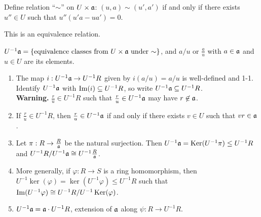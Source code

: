 \begin{definition}
    Define relation ``$\sim$'' on $U \times \mathfrak{a}$: $(u,a) \sim (u',a')$ if and only if there exists $u'' \in U$ such that $u''(u'a - ua') = 0$.
\end{definition}

\begin{fact}
    This is an equivalence relation.
\end{fact}

\begin{notation}
    $U^{-1}\mathfrak{a} = \{\text{equivalence classes from $U \times \mathfrak{a}$ under $\sim$}\}$, and $a/u$ or $\frac{a}{u}$ with $a \in \mathfrak{a}$ and $u \in U$ are its elements.
\end{notation}

\begin{proposition}
    \begin{enumerate}
        \item The map $i: U^{-1}\mathfrak{a} \to U^{-1}R$ given by $i(a/u) = a/u$ is well-defined and 1-1. Identify $U^{-1}\mathfrak{a}$ with $\operatorname{Im}(i) \subseteq U^{-1}R$, so write $U^{-1}\mathfrak{a} \subseteq U^{-1}R$. \\
            \textbf{Warning.} $\frac{r}{u} \in U^{-1}R$ such that $\frac{r}{u} \in U^{-1}\mathfrak{a}$ may have $r \not \in \mathfrak{a}$.
        \item If $\frac{r}{u} \in U^{-1}R$, then $\frac{r}{u} \in U^{-1}\mathfrak{a}$ if and only if there exists $v \in U$ such that $vr \in \mathfrak{a}$. 
        \item Let $\pi: R \to \frac{R}{\mathfrak{a}}$ be the natural surjection. Then $U^{-1}\mathfrak{a} = \operatorname{Ker}(U^{-1} \pi) \leq U^{-1}R$ and $U^{-1}R/U^{-1}\mathfrak{a} \cong U^{-1}\frac{R}{\mathfrak{a}}$.
        \item More generally, if $\varphi: R \to S$ is a ring homomorphism, then $U^{-1} \ker(\varphi) = \ker(U^{-1}\varphi) \leq U^{-1}R$ such that $\operatorname{Im}(U^{-1}\varphi) \cong U^{-1}R/U^{-1}\operatorname{Ker}(\varphi)$.
        \item $U^{-1}\mathfrak{a} = \mathfrak{a} \cdot U^{-1}R$, extension of $\mathfrak{a}$ along $\psi: R \to U^{-1}R$.
    \end{enumerate}
\end{proposition}

